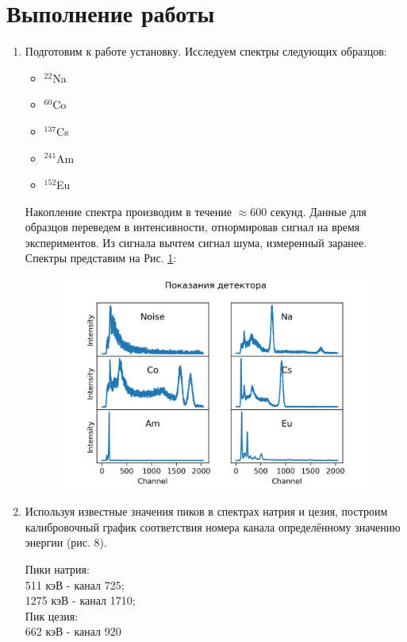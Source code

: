 \documentclass[a4paper, 12pt]{article}
\begin{document}
\section*{Выполнение работы}

\begin{enumerate}

    \item Подготовим к работе установку. Исследуем спектры следующих образцов:
    \begin{itemize}
        \item $^{22}$Na
        \item $^{60}$Co
        \item $^{137}$Cs
        \item $^{241}$Am
        \item $^{152}$Eu
    \end{itemize}
    Накопление спектра производим в течение $\approx$600 секунд. Данные для образцов переведем в интенсивности, отнормировав сигнал на время экспериментов. Из сигнала вычтем сигнал шума, измеренный заранее. Спектры представим на Рис. \ref{fig:data}:
    
    \begin{figure}[h]
        \centering
        \includegraphics{Data.png}
        \label{fig:data}
    \end{figure}

\item Используя известные значения пиков в спектрах натрия и цезия, построим калибровочный график соответствия номера канала определённому значению энергии (рис. 8). 
\begin{center}
    Пики натрия: \\
    511 кэВ - канал 725; \\
    1275 кэВ - канал 1710; \\
    Пик цезия:\\ 
    662 кэВ - канал 920 \\
\end{center}


\end{enumerate}
\end{document}
